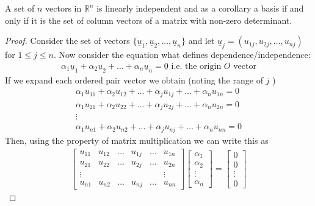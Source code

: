 \documentclass[a4paper]{article}
\theoremstyle{plain}
\newtheorem{thm}{Theorem}[section]
\theoremstyle{definition}
\theoremstyle{remark}
\begin{document}
\begin{tcolorbox}[colback=black!3!white,colframe=black!60!white,title=\begin{thm}Linear Independence using Determinant \label{Linear Independence using Determinant}\end{thm}]
	A set of $n$ vectors in $\mathbb{R}^{n}$ is linearly independent and as a corollary a basis if and only if it is the set of column vectors of a matrix with non-zero determinant.
	\begin{proof}
		Consider the set of vectors $\{  \underline{u}_1, \underline{u}_2, \ldots , \underline{u}_n\}$ and let $\underline{u}_j = (u_{1j}, u_{2j}, \ldots , u_{nj})$ for $1 \le j \le n$. Now consider the equation what defines dependence/independence:
		\begin{align}
			\alpha_1 \underline{u}_1 + \alpha_2\underline{u}_2 + \ldots + \alpha_n \underline{u}_n = \underline{0} \text{ i.e. the origin $O$ vector}
		\end{align}
		If we expand each ordered pair vector we obtain (noting the range of $j$ )
		\begin{align}
			\alpha_1u_{11} + \alpha_2u_{12} + \ldots + \alpha_j u_{1j} + \ldots + \alpha_n u_{1n}= 0 \\
			\alpha_1 u_{21} + \alpha_2 u_{22} + \ldots + \alpha_j u_{2j} + \ldots + \alpha_n u_{2n} = 0 \\
			\vdots \\
			\alpha_1 u_{n1} + \alpha_2 u_{n2} + \ldots + \alpha_j u_{nj} + \ldots + \alpha_n u_{nn}= 0
		\end{align}
		Then, using the property of matrix multiplication we can write this as
		\begin{align}
			\begin{bmatrix} u_{11} & u_{12} &\ldots & u_{1j} & \ldots & u_{1n} \\
			u_{21} & u_{22} & \ldots & u_{2j} & \ldots & u_{2n} \\
			\vdots & & & & & \vdots \\
			u_{n1} & u_{n2} & \ldots & u_{nj} & \ldots & u_{nn}
		\end{bmatrix} \begin{bmatrix} \alpha_1 \\ \alpha_2 \\ \vdots \\ \alpha_n \end{bmatrix} = \begin{bmatrix} 0 \\ 0 \\ \vdots \\ 0 \end{bmatrix} 

\end{align}
\end{proof}
\end{tcolorbox}
\end{document}
